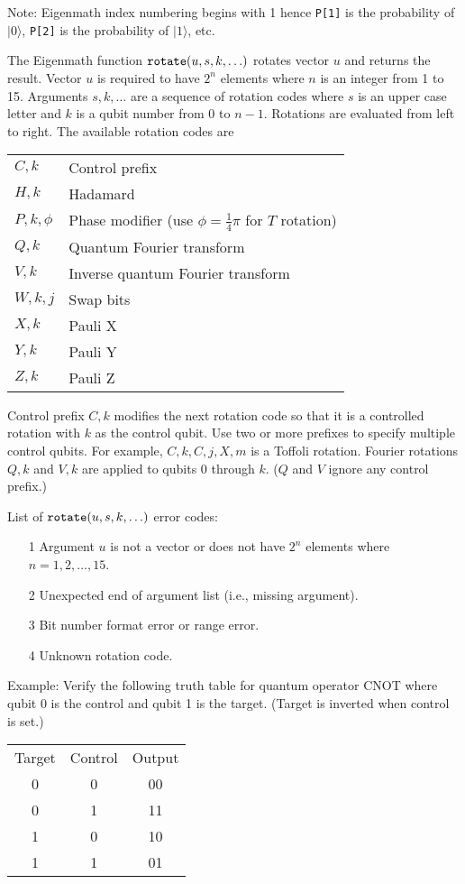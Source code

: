 \documentclass[12pt]{article}
\begin{document}
Note: Eigenmath index numbering begins with 1 hence
\verb$P[1]$ is the probability of $|0\rangle$,
\verb$P[2]$ is the probability of $|1\rangle$, etc.

\bigskip
The Eigenmath function
$\text{\tt rotate}(u,s,k,\ldots)$
rotates vector $u$ and returns the result.
Vector $u$ is required to have $2^n$ elements where $n$ is an
integer from 1 to 15.
Arguments $s,k,\ldots$ are a sequence of rotation codes
where $s$ is an upper case letter and $k$ is a qubit number
from 0 to $n-1$.
Rotations are evaluated from left to right.
The available rotation codes are

\begin{center}
\begin{tabular}{ll}
$C,k$ & Control prefix
\\
$H,k$ & Hadamard
\\
$P,k,\phi$ & Phase modifier (use $\phi=\tfrac{1}{4}\pi$ for $T$ rotation)
\\
$Q,k$ & Quantum Fourier transform
\\
$V,k$ & Inverse quantum Fourier transform
\\
$W,k,j$ & Swap bits
\\
$X,k$ & Pauli X
\\
$Y,k$ & Pauli Y
\\
$Z,k$ & Pauli Z
\end{tabular}
\end{center}

Control prefix $C,k$ modifies the next rotation code so that it
is a controlled rotation with $k$ as the control qubit.
Use two or more prefixes to specify multiple control qubits.
For example, $C,k,C,j,X,m$ is a Toffoli rotation.
Fourier rotations $Q,k$ and $V,k$ are applied to qubits 0 through $k$.
($Q$ and $V$ ignore any control prefix.)

\bigskip
List of $\text{\tt rotate}(u,s,k,\ldots)$ error codes:
\begin{itemize}
\item[1] Argument $u$ is not a vector or does not have $2^n$ elements where $n=1,2,\ldots,15$.
\item[2] Unexpected end of argument list (i.e., missing argument).
\item[3] Bit number format error or range error.
\item[4] Unknown rotation code.
\end{itemize}

Example:
Verify the following truth table for quantum operator CNOT
where qubit 0 is the control and qubit 1 is the target.
(Target is inverted when control is set.)
\begin{center}
\begin{tabular}{ccc}
Target & Control & Output \\
0 & 0 & 00 \\
0 & 1 & 11 \\
1 & 0 & 10 \\
1 & 1 & 01
\end{tabular}
\end{center}
\end{document}

